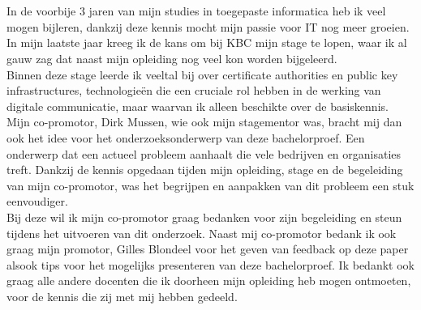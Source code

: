 
\chapter*{}%
\label{ch:voorwoord}


In de voorbije 3 jaren van mijn studies in toegepaste informatica heb ik veel mogen bijleren, dankzij deze kennis mocht mijn passie voor IT nog meer groeien. 
In mijn laatste jaar kreeg ik de kans om bij KBC mijn stage te lopen, waar ik al gauw zag dat naast mijn opleiding nog veel kon worden bijgeleerd. \\

Binnen deze stage leerde ik veeltal bij over certificate authorities en public key infrastructures, technologieën die een cruciale rol hebben in de werking van digitale communicatie, maar waarvan ik alleen beschikte over de basiskennis.
Mijn co-promotor, Dirk Mussen, wie ook mijn stagementor was, bracht mij dan ook het idee voor het onderzoeksonderwerp van deze bachelorproef. Een onderwerp dat een actueel probleem aanhaalt die vele bedrijven en organisaties treft.
Dankzij de kennis opgedaan tijden mijn opleiding, stage en de begeleiding van mijn co-promotor, was het begrijpen en aanpakken van dit probleem een stuk eenvoudiger. \\

Bij deze wil ik mijn co-promotor graag bedanken voor zijn begeleiding en steun tijdens het uitvoeren van dit onderzoek. 
Naast mij co-promotor bedank ik ook graag mijn promotor, Gilles Blondeel voor het geven van feedback op deze paper alsook tips voor het mogelijks presenteren van deze bachelorproef.
Ik bedankt ook graag alle andere docenten die ik doorheen mijn opleiding heb mogen ontmoeten, voor de kennis die zij met mij hebben gedeeld.